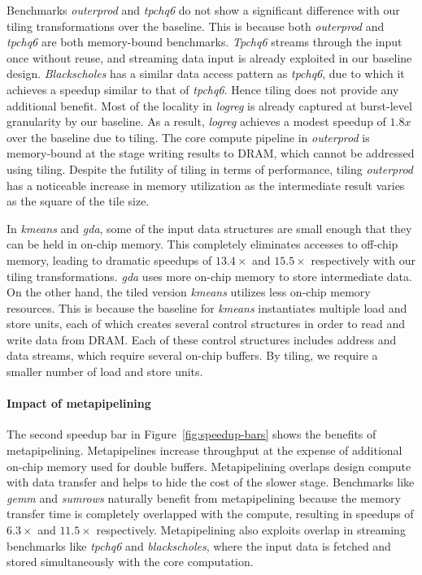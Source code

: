 Benchmarks \emph{outerprod} and \emph{tpchq6} do not
show a significant difference with our tiling transformations over the baseline.
This is because both \emph{outerprod} and
\emph{tpchq6} are both memory-bound benchmarks. \emph{Tpchq6} streams through the input once without reuse, and streaming
data input is already exploited in our baseline design. \emph{Blackscholes} has a similar data access pattern as \emph{tpchq6},
due to which it achieves a speedup similar to that of \emph{tpchq6}. Hence tiling does not provide any additional benefit.
Most of the locality in \emph{logreg} is already captured at burst-level granularity by our baseline. As a result, \emph{logreg}
achieves a modest speedup of $1.8x$ over the baseline due to tiling.
The core compute pipeline in \emph{outerprod} is memory-bound at the stage writing results to DRAM, which cannot be addressed
using tiling. Despite the futility of tiling in terms of performance, tiling \emph{outerprod}
has a noticeable increase in memory utilization as the intermediate result varies as the square of the tile size.

In \emph{kmeans} and \emph{gda}, some
of the input data structures are small enough that they can be held in on-chip memory. This completely
eliminates accesses to off-chip memory, leading to dramatic speedups of $13.4\times$ and $15.5\times$ respectively
with our tiling transformations. \emph{gda} uses more on-chip memory to store intermediate data. On the other hand, the tiled
version \emph{kmeans} utilizes less on-chip memory resources. This is because the baseline for \emph{kmeans} instantiates multiple
load and store units, each of which creates several control structures in order to read and write data from DRAM. Each of these control
structures includes address and data streams, which require several on-chip buffers. By tiling, we require a smaller number of load and
store units.

\paragraph{Impact of metapipelining}
The second speedup bar in Figure~\ref{fig:speedup-bars} shows the benefits of metapipelining. Metapipelines increase throughput
at the expense of additional on-chip memory used for double buffers.
Metapipelining overlaps design compute with data transfer and helps to hide the cost of the slower stage. Benchmarks like
\emph{gemm} and \emph{sumrows} naturally benefit from metapipelining because the memory transfer time is completely overlapped
with the compute, resulting in speedups of $6.3\times$ and $11.5\times$ respectively. Metapipelining also exploits overlap in
streaming benchmarks like \emph{tpchq6} and \emph{blackscholes}, where the input data is fetched and stored simultaneously with the core computation.

